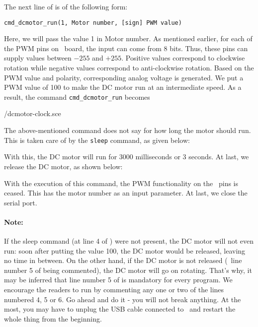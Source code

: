 \begin{enumerate}
        The next line of  is of the following form: 
        \begin{lstlisting}[style=nonumbers]
          cmd_dcmotor_run(1, Motor number, [sign] PWM value)
        \end{lstlisting}
        Here, we will pass the value 1 in Motor number.  As mentioned earlier, 
        for each of the PWM pins on \arduino\ board, the input can come from 8 bits.
        Thus, these pins can supply values between $- 255$ and $+ 255$. Positive values correspond to clockwise
        rotation while negative values correspond to anti-clockwise rotation. Based on the PWM value and polarity, 
        corresponding analog voltage is generated.  
        We put a PWM value of 100 to make the DC motor run at an intermediate speed.  
        As a result, the command {\tt cmd\_dcmotor\_run} becomes
        
        {\LocDCMscicode/dcmotor-clock.sce}
        
        The above-mentioned command does not say for how long the motor should run.  This is taken care of
        by the {\tt sleep} command, as given below:
        
        With this, the DC motor will run for 3000 milliseconds or 3 seconds. At last, 
        we release the DC motor, as shown below:
        
        With the execution of this command, the PWM functionality on the \arduino\ pins
        is ceased.  This has the motor number as an input
        parameter. At last, we close the serial port. 
        
        
        \paragraph{Note:} If the sleep command (at line 4 of ) 
        were not present, the DC motor will not even run: soon after putting the value 100, 
        the DC motor would be released, leaving no time in between.  On the other hand, if
        the DC motor is not released (\ie\ line number 5 of  being commented), 
        the DC motor will go on rotating. That's why, it may be inferred that 
        line number 5 of  is mandatory
        for every program. We encourage the readers to run   by commenting
        any one or two of the lines numbered 4, 5 or 6.  Go ahead and do it - you will not break
        anything.  At the most, you may have to unplug the USB cable connected to \arduino\ and
        restart the whole thing from the beginning.
        

\end{enumerate}
